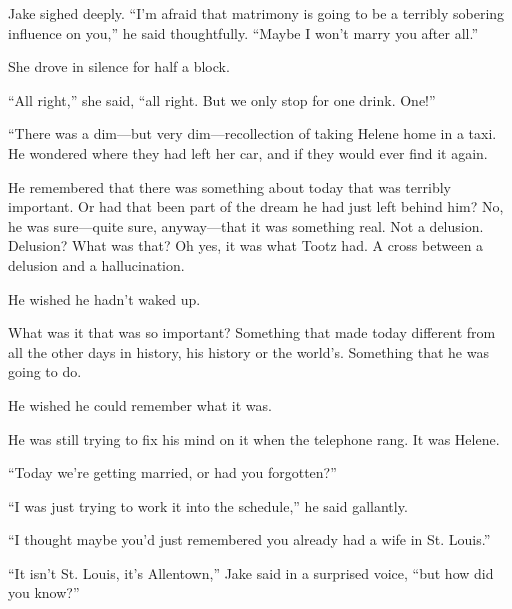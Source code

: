 \documentclass{novel}
\begin{document}
Jake sighed deeply. “I’m afraid that matrimony is going to be a terribly sobering influence on you,” he said thoughtfully. “Maybe I won’t marry you after all.”

She drove in silence for half a block.

“All right,” she said, “all right. But we only stop for one drink. One!”

\vspace{2\nbs}
\clearpage
\thispagestyle{empty}

\begin{ChapterStart}
\vspace{3\nbs}
\end{ChapterStart}

“There was a dim—but very dim—recollection of taking Helene home in a taxi. He wondered where they had left her car, and if they would ever find it again.

He remembered that there was something about today that was terribly important. Or had that been part of the dream he had just left behind him? No, he was sure—quite sure, anyway—that it was something real. Not a delusion. Delusion? What was that? Oh yes, it was what Tootz had. A cross between a delusion and a hallucination.

He wished he hadn’t waked up.

What was it that was so important? Something that made today different from all the other days in history, his history or the world’s. Something that he was going to do.

He wished he could remember what it was.

He was still trying to fix his mind on it when the telephone rang. It was Helene.

“Today we’re getting married, or had you forgotten?”

“I was just trying to work it into the schedule,” he said gallantly.

“I thought maybe you’d just remembered you already had a wife in St. Louis.”

“It isn’t St. Louis, it’s Allentown,” Jake said in a surprised voice, “but how did you know?”
\end{document}

